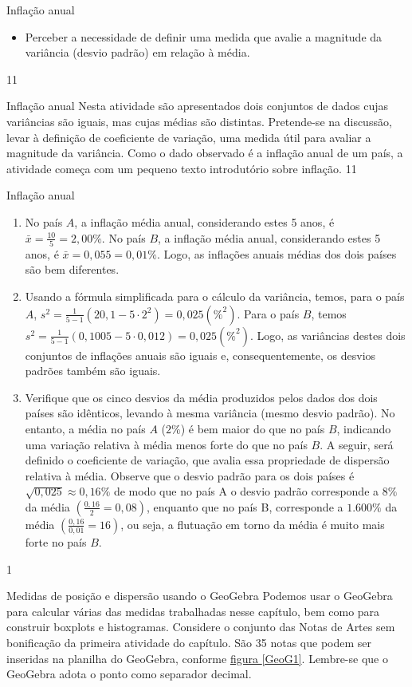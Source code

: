 {{\begin{objectives}{Inflação anual}
{\begin{itemize}
\item Perceber a necessidade de definir uma medida que avalie a magnitude da variância (desvio padrão) em relação à média.
\end{itemize}
}{1}{1}
\end{objectives}
\begin{sugestions}{Inflação anual}
{
Nesta atividade são apresentados dois conjuntos de dados cujas variâncias são iguais, mas cujas médias são distintas. Pretende-se na discussão, levar à definição de coeficiente de variação, uma medida útil para avaliar a magnitude da variância. Como o dado observado é a inflação anual de um país, a atividade começa com um pequeno texto introdutório sobre inflação.
}{1}{1}
\end{sugestions}
\begin{answer}{Inflação anual}
{
\begin{enumerate}
\item No país $A$, a inflação média anual, considerando estes 5 anos, é $\bar{x}=\frac{10}{5}=2{,}00\%$. No país $B$, a inflação média anual, considerando estes 5 anos, é $\bar{x}=0{,}055=0{,}01\%$. Logo, as inflações anuais médias dos dois países são bem diferentes.

\item Usando a fórmula simplificada para o cálculo da variância, temos, para o país $A$, $s^2=\frac{1}{5-1}(20,1-5\cdot2^2)=0{,}025(\%^2)$. Para o país $B$, temos $s^2=\frac{1}{5-1}(0{,}1005-5\cdot0{,}012)=0{,}025(\%^2)$. Logo, as variâncias destes dois conjuntos de inflações anuais são iguais e, consequentemente, os desvios padrões também são iguais.

\item Verifique que os cinco desvios da média produzidos pelos dados dos dois países são idênticos, levando à mesma variância (mesmo desvio padrão). No entanto, a média no país $A$ ($2\%$) é bem maior do que no país $B$, indicando uma variação relativa à média menos forte do que no país $B$. A seguir, será definido o coeficiente de variação, que avalia essa propriedade de dispersão relativa à média. Observe que o desvio padrão para os dois países é $\sqrt{0{,}025}\approx0{,}16\%$ de modo que no país A o desvio padrão corresponde a $8\%$ da média $(\frac{0{,}16}{2}=0{,}08)$, enquanto que no país B, corresponde a $1.600\%$ da média $(\frac{0{,}16}{0{,}01}=16)$, ou seja, a flutuação em torno da média é muito mais forte no país $B$.
\end{enumerate}
}{1}
\end{answer}
\begin{example}{Medidas de posição e dispersão usando o GeoGebra}
Podemos usar o GeoGebra para calcular várias das medidas trabalhadas nesse capítulo, bem como para construir boxplots e histogramas. Considere o conjunto das Notas de Artes sem bonificação da primeira atividade do capítulo. São 35 notas que podem ser inseridas na planilha do GeoGebra, conforme \hyperref[GeoG1]{figura \ref{GeoG1}}. Lembre-se que o GeoGebra adota o ponto como separador decimal.


\end{example}}}

